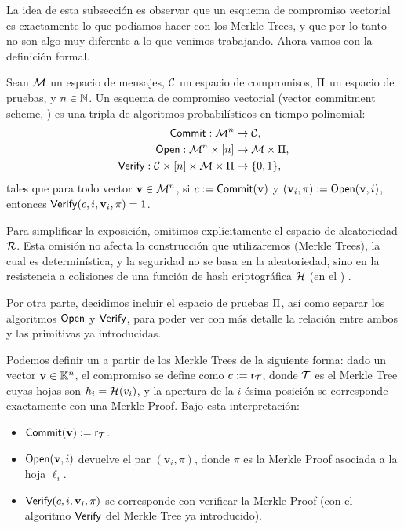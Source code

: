 La idea de esta subsección es observar que un esquema de compromiso vectorial es exactamente lo que podíamos hacer con los Merkle Trees, y que por lo tanto no son algo muy diferente a lo que venimos trabajando. Ahora vamos con la definición formal.

\begin{definition}[\VCS]
\label{def:apendice-b-commitment-schemes-vcs}
		Sean $\mathcal{M}$ un espacio de mensajes, $\mathcal{C}$ un espacio de compromisos, $\Pi$ un espacio de pruebas, y $n \in \mathbb{N}$. Un esquema de compromiso vectorial (vector commitment scheme, \VCS) es una tripla de algoritmos probabilísticos en tiempo polinomial:
	$$\begin{aligned}
		\mathsf{Commit}: \mathcal{M}^n &\to \mathcal{C}, \\
		\mathsf{Open}: \mathcal{M}^n \times [n] &\to \mathcal{M} \times \Pi, \\
		\mathsf{Verify}: \mathcal{C} \times [n] \times \mathcal{M} \times \Pi &\to \{0,1\},
	\end{aligned}$$
	tales que para todo vector $\mathbf{v} \in \mathcal{M}^n$, si $c := \mathsf{Commit}(\mathbf{v})$ y $(\mathbf{v}_i,\pi) := \mathsf{Open}(\mathbf{v}, i)$, entonces $\mathsf{Verify}(c, i, \mathbf{v}_i, \pi) = 1$.
\end{definition}

Para simplificar la exposición, omitimos explícitamente el espacio de aleatoriedad $\mathcal{R}$. Esta omisión no afecta la construcción que utilizaremos (Merkle Trees), la cual es determinística, y la seguridad no se basa en la aleatoriedad, sino en la resistencia a colisiones de una función de hash criptográfica $\mathcal{H}$ (en el \ROM) \cite{katz}.

Por otra parte, decidimos incluir el espacio de pruebas $\Pi$, así como separar los algoritmos $\mathsf{Open}$ y $\mathsf{Verify}$, para poder ver con más detalle la relación entre ambos y las primitivas ya introducidas.

Podemos definir un \VCS a partir de los Merkle Trees de la siguiente forma: dado un vector $\mathbf{v} \in \mathbb{K}^n$, el compromiso se define como $c := \mathsf{r}_{\mathcal{T}}$, donde $\mathcal{T}$ es el Merkle Tree cuyas hojas son $h_i = \mathcal{H}(v_i)$, y la apertura de la $i$-ésima posición se corresponde exactamente con una Merkle Proof. Bajo esta interpretación:

\begin{itemize}[itemsep=0.1cm]
	\item $\mathsf{Commit}(\mathbf{v}) := \mathsf{r}_{\mathcal{T}}$.
	\item $\mathsf{Open}(\mathbf{v},i)$ devuelve el par $(\mathbf{v}_i,\pi)$, donde $\pi$ es la Merkle Proof asociada a la hoja $\ell_i$.
	\item $\mathsf{Verify}(c, i, \mathbf{v}_i, \pi)$ se corresponde con verificar la Merkle Proof (con el algoritmo $\mathsf{Verify}$ del Merkle Tree ya introducido).
\end{itemize}

